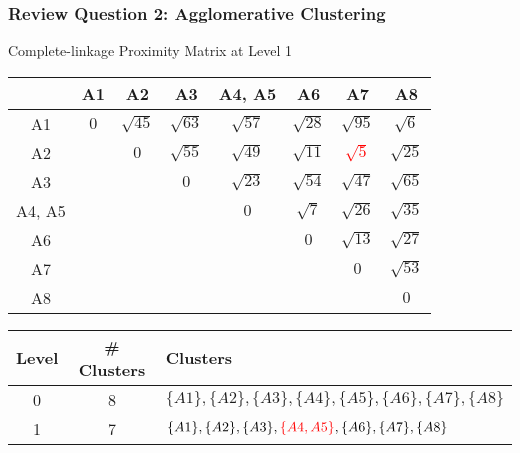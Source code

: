 \documentclass[aspectratio=169, 10pt]{beamer}
\begin{document}
\begin{frame}[t]
    \frametitle{Review Question 2: Agglomerative Clustering}
    \small

    Complete-linkage Proximity Matrix at Level 1

    \begin{table}[]
        \scriptsize
        \begin{tabular}{c|ccccccc}
                & A1  & A2          & A3          & A4, A5                             & A6                                & A7                                 & A8                                 \\ \hline
        A1      & $0$ & $\sqrt{45}$ & $\sqrt{63}$ & {\color[HTML]{000000} $\sqrt{57}$} & $\sqrt{28}$                       & $\sqrt{95}$                        & $\sqrt{6}$                         \\
        A2      &     & $0$         & $\sqrt{55}$ & {\color[HTML]{000000} $\sqrt{49}$} & $\sqrt{11}$                       & \textcolor{red}{$\sqrt{5}$}                         & $\sqrt{25}$                        \\
        A3      &     &             & $0$         & {\color[HTML]{000000} $\sqrt{23}$} & $\sqrt{54}$                       & $\sqrt{47}$                        & $\sqrt{65}$                        \\
        A4, A5  &     &             &             & {\color[HTML]{000000} $0$}         & {\color[HTML]{000000} $\sqrt{7}$} & {\color[HTML]{000000} $\sqrt{26}$} & {\color[HTML]{000000} $\sqrt{35}$} \\
        A6      &     &             &             &                                    & $0$                               & $\sqrt{13}$                        & $\sqrt{27}$                        \\
        A7      &     &             &             &                                    &                                   & $0$                                & $\sqrt{53}$                        \\
        A8      &     &             &             &                                    &                                   &                                    & $0$                               
        \end{tabular}
    \end{table}

    \begin{table}[]
        \scriptsize
        \begin{tabular}{c|c|l}
        Level & \# Clusters & Clusters \\ \hline
        0     & 8           & $\{A1\}, \{A2\}, \{A3\}, \{A4\}, \{A5\}, \{A6\}, \{A7\}, \{A8\}$\\
        1     & 7           & $\{A1\}, \{A2\}, \{A3\}, \textcolor{red}{\{A4, A5\}}, \{A6\}, \{A7\}, \{A8\}$\\
        \end{tabular}
    \end{table}


\end{frame}
\end{document}
